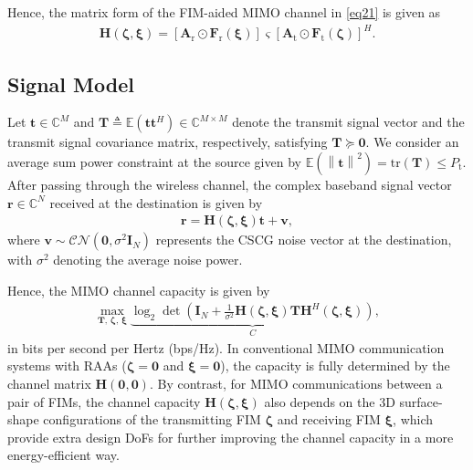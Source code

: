 \documentclass[lettersize,journal]{IEEEtran}
\begin{document}
Hence, the matrix form of the FIM-aided MIMO channel in \eqref{eq21} is given as
\begin{align}\label{eq25}
 \mathbf{H}\left ( \boldsymbol{\zeta},\boldsymbol{\xi} \right )=\left [ \mathbf{A}_{\textrm{r}}\odot \mathbf{F}_{\textrm{r}}\left ( \boldsymbol{\xi} \right ) \right ]\boldsymbol{\varsigma } \left [ \mathbf{A}_{\textrm{t}}\odot \mathbf{F}_{\textrm{t}}\left ( \boldsymbol{\zeta} \right ) \right ]^{H}.
\end{align}

\subsection{Signal Model}
Let $\mathbf{t}\in \mathbb{C}^{M }$ and $\mathbf{T} \triangleq \mathbb{E}\left ( \mathbf{t}\mathbf{t}^{H} \right ) \in \mathbb{C}^{M\times M}$ denote the transmit signal vector and the transmit signal covariance matrix, respectively, satisfying $\mathbf{T} \succeq \mathbf{0}$. We consider an average sum power constraint at the source given by $\mathbb{E} \left ( \left \| \mathbf{t} \right \|^{2} \right ) = \textrm{tr} \left ( \mathbf{T} \right )\leq P_{\textrm{t}}$. After passing through the wireless channel, the complex baseband signal vector $\mathbf{r}\in \mathbb{C}^{N }$ received at the destination is given by
\begin{align}
 \mathbf{r}=\mathbf{H}\left ( \boldsymbol{\zeta},\boldsymbol{\xi} \right )\mathbf{t}+\mathbf{v},
\end{align}
where $\mathbf{v} \sim \mathcal{CN}\left ( \mathbf{0},\sigma^{2} \mathbf{I}_{N} \right )$ represents the CSCG noise vector at the destination, with $\sigma^{2}$ denoting the average noise power.



Hence, the MIMO channel capacity is given by
\begin{align}\label{eq29}
 \underset{\mathbf{T},\, \boldsymbol{\zeta},\, \boldsymbol{\xi}}{\max}\underbrace{\log_{2}\det\left ( \mathbf{I}_{N}+\frac{1}{\sigma ^{2}}\mathbf{H}\left ( \boldsymbol{\zeta},\boldsymbol{\xi} \right )\mathbf{T}\mathbf{H}^{H}\left ( \boldsymbol{\zeta},\boldsymbol{\xi} \right ) \right )}_{C},
\end{align}
in bits per second per Hertz (bps/Hz). In conventional MIMO communication systems with RAAs ($\boldsymbol{\zeta}=\mathbf{0}$ and $\boldsymbol{\xi}=\mathbf{0}$), the capacity is fully determined by the channel matrix $\mathbf{H}\left ( \mathbf{0},\mathbf{0} \right )$. By contrast, for MIMO communications between a pair of FIMs, the channel capacity $\mathbf{H}\left ( \boldsymbol{\zeta},\boldsymbol{\xi} \right )$ also depends on the 3D surface-shape configurations of the transmitting FIM $\boldsymbol{\zeta}$ and receiving FIM $\boldsymbol{\xi}$, which provide extra design DoFs for further improving the channel capacity in a more energy-efficient way.
\end{document}
